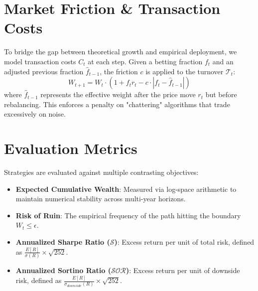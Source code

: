 \section{Market Friction \& Transaction Costs}
To bridge the gap between theoretical growth and empirical deployment, we model transaction costs $C_t$ at each step. Given a betting fraction $f_t$ and an adjusted previous fraction $\hat{f}_{t-1}$, the friction $c$ is applied to the turnover $\mathcal{T}_t$:
\begin{equation}
    W_{t+1} = W_t \cdot (1 + f_t r_t - c \cdot |f_t - \hat{f}_{t-1}|)
\end{equation}
where $\hat{f}_{t-1}$ represents the effective weight after the price move $r_t$ but before rebalancing. This enforces a penalty on "chattering" algorithms that trade excessively on noise.

\section{Evaluation Metrics}
Strategies are evaluated against multiple contrasting objectives:
\begin{itemize}
    \item \textbf{Expected Cumulative Wealth}: Measured via log-space arithmetic to maintain numerical stability across multi-year horizons.
    \item \textbf{Risk of Ruin}: The empirical frequency of the path hitting the boundary $W_t \leq \epsilon$.
    \item \textbf{Annualized Sharpe Ratio ($\mathcal{S}$)}: Excess return per unit of total risk, defined as $\frac{E[R]}{\sigma(R)} \times \sqrt{252}$.
    \item \textbf{Annualized Sortino Ratio ($\mathcal{SOR}$)}: Excess return per unit of downside risk, defined as $\frac{E[R]}{\sigma_{downside}(R)} \times \sqrt{252}$.
\end{itemize}
